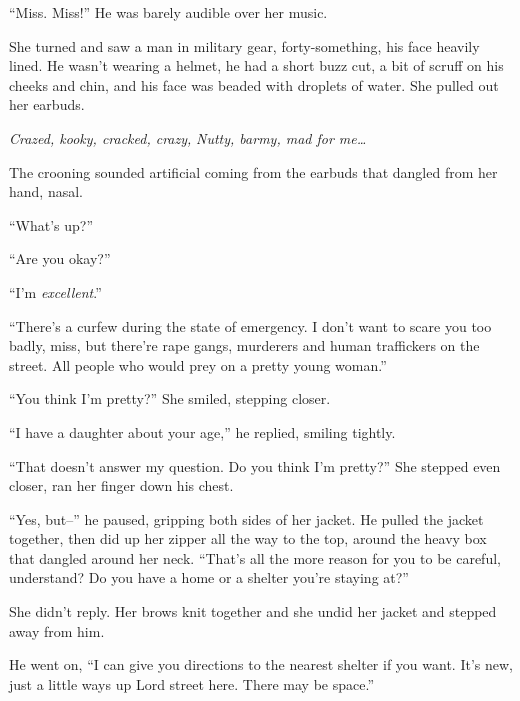 ``Miss.  Miss!''  He was barely audible over her music.



She turned and saw a man in military gear, forty-something, his face heavily lined.  He wasn't wearing a helmet, he had a short buzz cut, a bit of scruff on his cheeks and chin, and his face was beaded with droplets of water.  She pulled out her earbuds.



\emph{Crazed, kooky, cracked, crazy, }\emph{Nutty, barmy, mad for me\ldots}



The crooning sounded artificial coming from the earbuds that dangled from her hand, nasal.



``What's up?''



``Are you okay?''



``I'm \emph{excellent}.''



``There's a curfew during the state of emergency.  I don't want to scare you too badly, miss, but there're rape gangs, murderers and human traffickers on the street.  All people who would prey on a pretty young woman.''



``You think I'm pretty?'' She smiled, stepping closer.



``I have a daughter about your age,'' he replied, smiling tightly.



``That doesn't answer my question.  Do you think I'm pretty?''  She stepped even closer, ran her finger down his chest.



``Yes, but--'' he paused, gripping both sides of her jacket.  He pulled the jacket together, then did up her zipper all the way to the top, around the heavy box that dangled around her neck.  ``That's all the more reason for you to be careful, understand?  Do you have a home or a shelter you're staying at?''



She didn't reply.  Her brows knit together and she undid her jacket and stepped away from him.



He went on, ``I can give you directions to the nearest shelter if you want. It's new, just a little ways up Lord street here.  There may be space.''



